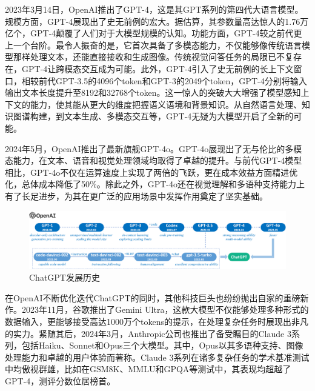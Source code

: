 \documentclass[a4paper]{report}
\begin{document}
2023年3月14日，OpenAI推出了GPT-4，这是其GPT系列的第四代大语言模型。规模方面，GPT-4展现出了史无前例的宏大。据估算，其参数量高达惊人的1.76万亿个，GPT-4颠覆了人们对于大模型规模的认知。功能方面，GPT-4较之前代更上一个台阶。最令人振奋的是，它首次具备了多模态能力，不仅能够像传统语言模型那样处理文本，还能直接接收和生成图像。传统视觉问答任务的局限已不复存在，GPT-4让跨模态交互成为可能。此外，GPT-4引入了史无前例的长上下文窗口，相较前代GPT-3.5的4096个token和GPT-3的2049个token，GPT-4分别将输入输出文本长度提升至8192和32768个token。这一惊人的突破大大增强了模型感知上下文的能力，使其能从更大的维度把握语义语境和背景知识。从自然语言处理、知识图谱构建，到文本生成、多模态交互等，GPT-4无疑为大模型开启了全新的可能。

2024年5月，OpenAI推出了最新旗舰GPT-4o。GPT-4o展现出了无与伦比的多模态能力，在文本、语音和视觉处理领域均取得了卓越的提升。与前代GPT-4模型相比，GPT-4o不仅在运算速度上实现了两倍的飞跃，更在成本效益方面精进优化，总体成本降低了50\%。除此之外，GPT-4o还在视觉理解和多语种支持能力上有了长足进步，为其在更广泛的应用场景中发挥作用奠定了坚实基础。
\begin{figure}[H]
	\centering
	\includegraphics[width=\textwidth]{figures/OpenAI.pdf}
	\caption{ChatGPT发展历史}
	\label{ChatGPT发展历史}
\end{figure}

在OpenAI不断优化迭代ChatGPT的同时，其他科技巨头也纷纷抛出自家的重磅新作。2023年11月，谷歌推出了Gemini Ultra，这款大模型不仅能够处理多种形式的数据输入，更能够接受高达1000万个tokens的提示，在处理复杂任务时展现出非凡的实力。紧随其后，2024年3月，Anthropic公司也推出了备受瞩目的Claude 3系列，包括Haiku、Sonnet和Opus三个大模型。其中，Opus以其多语种支持、图像处理能力和卓越的用户体验而著称。Claude 3系列在诸多复杂任务的学术基准测试中均傲视群雄，比如在GSM8K、MMLU和GPQA等测试中，其表现均超越了GPT-4，测评分数位居榜首。
\end{document}

